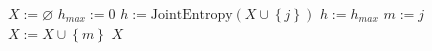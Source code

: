\begin{algorithmic}[1]
        \State $X:=\varnothing$
            \State $h_{max}:=0$
                \State $h:=\textrm{JointEntropy}(X \cup \left\{j\right\})$
                    \State $h:=h_{max}$
                    \State $m:=j$
                    \State $X:=X \cup \left\{m\right\}$
                \EndIf
            \EndFor
        \EndFor
        \State \Return $X$
    \EndFunction
\end{algorithmic}